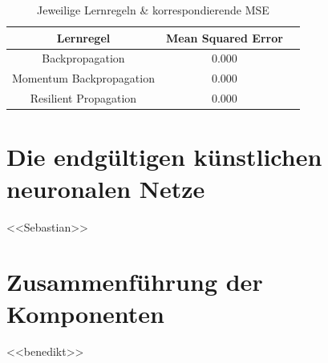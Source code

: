 \begin{table}[H]
  \centering
  \begin{tabular}{|c|c|c|}
  \hline 
  \rule[0ex]{0pt}{2.5ex} Lernregel & Mean Squared Error \\ 
  \hline 
  \rule[0ex]{0pt}{2.5ex} Backpropagation & 0.000 \\ 
  \hline 
  \rule[0ex]{0pt}{2.5ex} Momentum Backpropagation & 0.000\\ 
  \hline 
  \rule[0ex]{0pt}{2.5ex} Resilient Propagation & 0.000 \\ 
  \hline 
  \end{tabular} 
  \caption{Jeweilige Lernregeln \& korrespondierende MSE}
  \label{tab:tab3}
\end{table}



\section{Die endgültigen künstlichen neuronalen Netze}
<<Sebastian>> \Blindtext
\section{Zusammenführung der Komponenten}
<<benedikt>> \Blindtext
